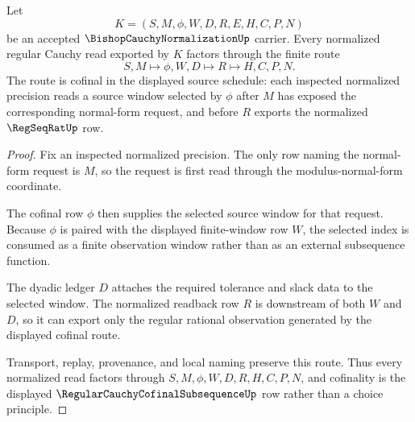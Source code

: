 \begin{theorem}
\label{thm:bishop-cauchy-normalization-cofinal-subsequence-route}
Let
$$
K=(S,M,\phi,W,D,R,E,H,C,P,N)
$$
be an accepted $\BishopCauchyNormalizationUp$ carrier. Every normalized regular Cauchy read exported by $K$ factors through the finite route
$$
S,M \longmapsto \phi,W,D \longmapsto R \longmapsto H,C,P,N .
$$
The route is cofinal in the displayed source schedule: each inspected normalized precision reads a source window selected by $\phi$ after $M$ has exposed the corresponding normal-form request, and before $R$ exports the normalized $\RegSeqRatUp$ row.
\end{theorem}
\begin{proof}
Fix an inspected normalized precision. The only row naming the normal-form request is $M$, so the request is first read through the modulus-normal-form coordinate.

The cofinal row $\phi$ then supplies the selected source window for that request. Because $\phi$ is paired with the displayed finite-window row $W$, the selected index is consumed as a finite observation window rather than as an external subsequence function.

The dyadic ledger $D$ attaches the required tolerance and slack data to the selected window. The normalized readback row $R$ is downstream of both $W$ and $D$, so it can export only the regular rational observation generated by the displayed cofinal route.

Transport, replay, provenance, and local naming preserve this route. Thus every normalized read factors through $S,M,\phi,W,D,R,H,C,P,N$, and cofinality is the displayed $\RegularCauchyCofinalSubsequenceUp$ row rather than a choice principle.
\end{proof}

